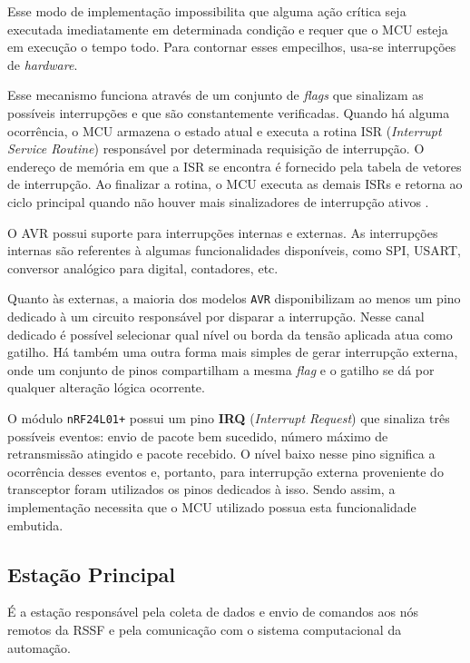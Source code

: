 Esse modo de implementação impossibilita que alguma ação crítica seja executada imediatamente em determinada
condição e requer que o MCU esteja em execução o tempo todo. Para contornar esses empecilhos, usa-se
interrupções de \textit{hardware}.

Esse mecanismo funciona através de um conjunto de \textit{flags} que sinalizam as possíveis interrupções e que
são constantemente verificadas. Quando há alguma ocorrência, o MCU armazena o estado atual e executa a rotina
ISR (\textit{Interrupt Service Routine}) responsável por determinada requisição de interrupção. O endereço de
memória em que a ISR se encontra é fornecido pela tabela de vetores de interrupção. Ao finalizar a rotina, o
MCU executa as demais ISRs e retorna ao ciclo principal quando não houver mais sinalizadores de interrupção
ativos \cite{williams2014}.

O AVR possui suporte para interrupções internas e externas. As interrupções internas são referentes à algumas
funcionalidades disponíveis, como SPI, USART, conversor analógico para digital, contadores, etc.

Quanto às externas, a maioria dos modelos \texttt{AVR} disponibilizam ao menos um pino dedicado à um circuito
responsável por disparar a interrupção. Nesse canal dedicado é possível selecionar qual nível ou borda da tensão
aplicada atua como gatilho. Há também uma outra forma mais simples de gerar interrupção externa, onde um
conjunto de pinos compartilham a mesma \textit{flag} e o gatilho se dá por qualquer alteração lógica
ocorrente.

O módulo \texttt{nRF24L01+} possui um pino \textbf{IRQ} (\textit{Interrupt Request}) que sinaliza três possíveis
eventos: envio de pacote bem sucedido, número máximo de retransmissão atingido e pacote recebido. O nível
baixo nesse pino significa a ocorrência desses eventos e, portanto, para interrupção externa proveniente do
transceptor foram utilizados os pinos dedicados à isso. Sendo assim, a implementação necessita que o MCU
utilizado possua esta funcionalidade embutida.

\subsection{Estação Principal}
É a estação responsável pela coleta de dados e envio de comandos aos nós remotos da RSSF e pela comunicação
com o sistema computacional da automação.


